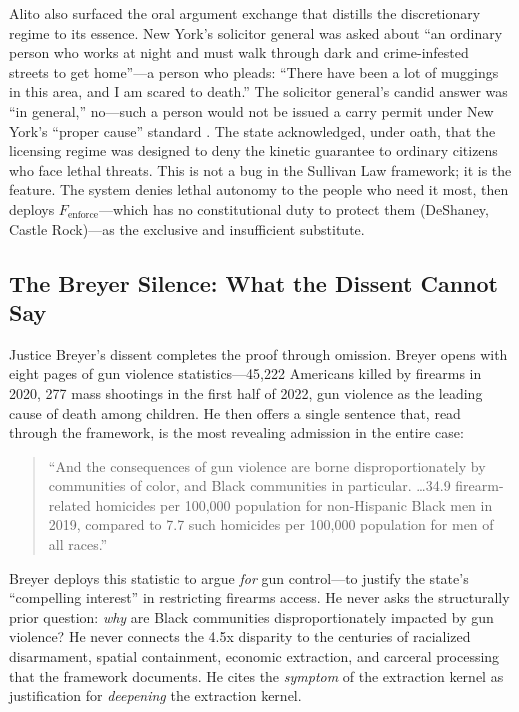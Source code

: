 \documentclass[12pt,openany]{book}
\begin{document}
Alito also surfaced the oral argument exchange that distills the discretionary regime to its essence. New York's solicitor general was asked about ``an ordinary person who works at night and must walk through dark and crime-infested streets to get home''---a person who pleads: ``There have been a lot of muggings in this area, and I am scared to death.'' The solicitor general's candid answer was ``in general,'' no---such a person would not be issued a carry permit under New York's ``proper cause'' standard \cite{bruen}. The state acknowledged, under oath, that the licensing regime was designed to deny the kinetic guarantee to ordinary citizens who face lethal threats. This is not a bug in the Sullivan Law framework; it is the feature. The system denies lethal autonomy to the people who need it most, then deploys $F_{\text{enforce}}$---which has no constitutional duty to protect them (DeShaney, Castle Rock)---as the exclusive and insufficient substitute.

\subsection{The Breyer Silence: What the Dissent Cannot Say}

Justice Breyer's dissent completes the proof through omission. Breyer opens with eight pages of gun violence statistics---45,222 Americans killed by firearms in 2020, 277 mass shootings in the first half of 2022, gun violence as the leading cause of death among children. He then offers a single sentence that, read through the framework, is the most revealing admission in the entire case:

\begin{quote}
``And the consequences of gun violence are borne disproportionately by communities of color, and Black communities in particular. \ldots 34.9 firearm-related homicides per 100,000 population for non-Hispanic Black men in 2019, compared to 7.7 such homicides per 100,000 population for men of all races.'' \cite{bruen}
\end{quote}

Breyer deploys this statistic to argue \textit{for} gun control---to justify the state's ``compelling interest'' in restricting firearms access. He never asks the structurally prior question: \textit{why} are Black communities disproportionately impacted by gun violence? He never connects the 4.5x disparity to the centuries of racialized disarmament, spatial containment, economic extraction, and carceral processing that the framework documents. He cites the \textit{symptom} of the extraction kernel as justification for \textit{deepening} the extraction kernel.
\end{document}
